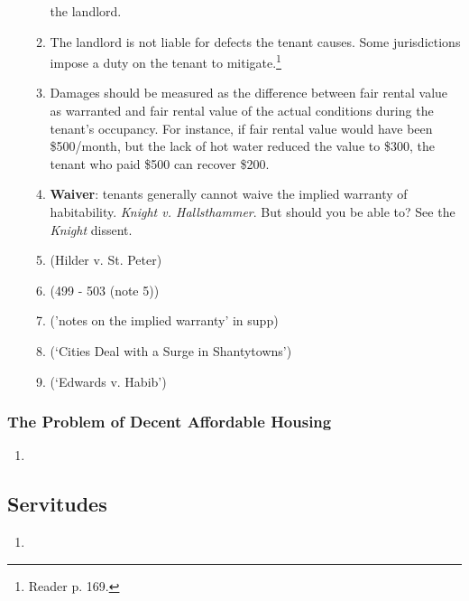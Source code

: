 \begin{enumerate}
\begin{enumerate}
        the landlord.
        \item The landlord is not liable for defects the tenant causes. Some 
        jurisdictions impose a duty on the tenant to mitigate.\footnote{Reader p. 
        169.}
        \item Damages should be measured as the difference between fair rental 
        value as warranted and fair rental value of the actual conditions during 
        the tenant's occupancy. For instance, if fair rental value would have been 
        \$500/month, but the lack of hot water reduced the value to \$300, the 
        tenant who paid \$500 can recover \$200.
        \item \textbf{Waiver}: tenants generally cannot waive the implied 
        warranty of habitability. \emph{Knight v. Hallsthammer}. But should 
        you be able to? See the \emph{Knight} dissent.
        \item (Hilder v. St. Peter) %
        \item (499 - 503 (note 5)) %
        \item ('notes on the implied warranty' in supp) %
        \item (`Cities Deal with a Surge in Shantytowns') %
        \item (`Edwards v. Habib') %
    \end{enumerate}
\end{enumerate}

\subsubsection{The Problem of Decent Affordable Housing}

\begin{enumerate}
    \item %
\end{enumerate}

\subsection{Servitudes}

\begin{enumerate}
    \item %
\end{enumerate}
